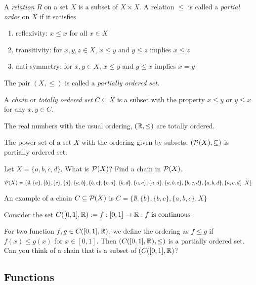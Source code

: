 \documentclass{article}
\begin{document}
\begin{definition}
A \emph{relation} $R$ on a set $X$ is a subset of $X \times X$. A relation $\leq$ is called a \emph{partial order} on $X$ if it satisfies
\begin{enumerate}
\item reflexivity: $x \leq x$ for all $x \in X$
\item transitivity: for $x,y,z \in X$, $x \leq y$ and $y \leq z$ implies $x \leq z$
\item anti-symmetry: for $x,y \in X$, $x \leq y$ and $y \leq x$ implies $x = y$
\end{enumerate}
The pair $(X, \leq)$ is called a \emph{partially ordered set}.

A \emph{chain} or \emph{totally ordered set} $C \subseteq X$ is a subset with the property $x \leq y$ or $y \leq x$ for any $x,y \in C$.
\end{definition}


\begin{example}
The real numbers with the usual ordering, $({\mathbb{R}}, \leq)$ are totally ordered. 
\end{example}

\begin{example}
The power set of a set $X$ with the ordering given by subsets, $(\mathcal{P}(X), \subseteq)$ is partially ordered set. 

Let $X = \{a,b,c,d\}$. What is $\mathcal{P}(X)$? Find a chain in $\mathcal{P}(X)$.

$\mathcal{P}(X) = \{\emptyset,\{a\},\{b\},\{c\},\{d\},\{a,b\},\{b,c\},\{c,d\},\{b,d\},\{a,c\},\{a,d\}, \{a,b,c\},\{b,c,d\},\{a,b,d\},\{a,c,d\},X\}$

An example of a chain $C \subseteq \mathcal{P}(X)$ is $C = \{\emptyset,\{b\},\{b,c\}, \{a,b,c\},X\}$
\end{example}

\begin{example}
Consider the set $C([0,1],{\mathbb{R}}):= {f:[0,1] \to {\mathbb{R}} : f \text{ is continuous}}$.

For two function $f,g \in C([0,1],{\mathbb{R}})$, we define the ordering as $f \leq g$ if $f(x) \leq g(x)$ for $x \in [0,1]$. Then $(C([0,1],{\mathbb{R}}),\leq)$ is a partially ordered set. Can you think of a chain that is a subset of $(C([0,1],{\mathbb{R}})$?
\end{example}


\subsection{Functions}
\end{document}
